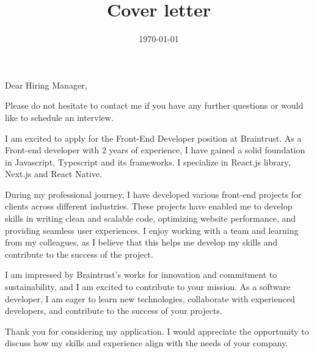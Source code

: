 \documentclass[11pt,a4paper,roman]{moderncv}        %
\title{Cover letter}
\begin{document}
\date{\today}
\opening{Dear Hiring Manager,}
\closing{Please do not hesitate to contact me if you have any further questions or would like to schedule an interview.
}
\makelettertitle

I am excited to apply for the Front-End Developer position at Braintrust. As a Front-end developer with 2 years of experience, I have gained a solid foundation in Javascript, Typescript and its frameworks. I specialize in React.js library, Next.js and React Native.

During my professional journey, I have developed various front-end projects for clients across different industries. These projects have enabled me to develop skills in writing clean and scalable code, optimizing website performance, and providing seamless user experiences. I enjoy working with a team and learning from my colleagues, as I believe that this helps me develop my skills and contribute to the success of the project.

I am impressed by Braintrust's works for innovation and commitment to sustainability, and I am excited to contribute to your mission. As a software developer, I am eager to learn new technologies, collaborate with experienced developers, and contribute to the success of your projects.

Thank you for considering my application. I would appreciate the opportunity to discuss how my skills and experience align with the needs of your company.



\vspace{0.5cm}


\makeletterclosing
\end{document}
